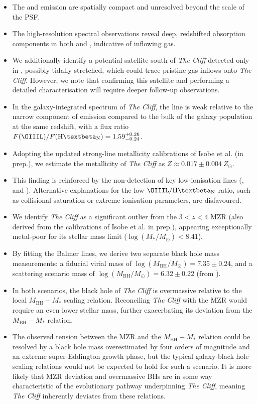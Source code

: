\documentclass[fleqn,usenatbib]{mnras}
\newcommand{\Halpha}{\text{H\textalpha}\xspace}
\newcommand{\Hbeta}{\text{H\textbeta}\xspace}
\newcommand{\OIIall}{\forbiddenEL[O][ii][\textlambda][\textlambda][3727,][3729]}
\newcommand{\SIIall}{\forbiddenEL[S][ii][\textlambda][\textlambda][6716,][6731]}
\newcommand{\NIIall}{\forbiddenEL[N][ii][\textlambda][\textlambda][6548,][6583]}
\newcommand{\cliff}{\textit{The Cliff}\xspace}
\begin{document}
\begin{itemize}
    \item The \Hbeta and \OIIIL emission are spatially compact and unresolved beyond the scale of the PSF.
    \item The high-resolution spectral observations reveal deep, redshifted absorption components in both \Halpha and \Hbeta, indicative of inflowing gas. 
    \item We additionally identify a potential satellite south of \cliff detected only in \Halpha, possibly tidally stretched, which could trace pristine gas inflows onto \cliff. However, we note that confirming this satellite and performing a detailed characterisation will require deeper follow-up observations.
    \item In the galaxy-integrated spectrum of \cliff, the \OIIIL[5007] line is weak relative to the narrow component of \Hbeta emission compared to the bulk of the galaxy population at the same redshift, with a flux ratio $F(\OIIIL)/F(\Hbeta_\mathrm{N}) = 1.59^{+0.26}_{-0.24}$.
    \item Adopting the updated strong-line metallicity calibrations of Isobe et al. (in prep.), we estimate the metallicity of \cliff as $Z \approx 0.017\pm0.004 \ Z_\odot$.
    \item This finding is reinforced by the non-detection of key low-ionisation lines (\OIIall, \NIIall and \SIIall). Alternative explanations for the low $\OIIIL/\Hbeta_\mathrm{N}$ ratio, such as collisional saturation or extreme ionisation parameters, are disfavoured. 
    \item We identify \cliff as a significant outlier from the $3<z<4$ MZR (also derived from the calibrations of Isobe et al. in prep.), appearing exceptionally metal-poor for its stellar mass limit ($\log(M_\ast/M_\odot) < 8.41$).
    \item By fitting the Balmer lines, we derive two separate black hole mass measurements: a fiducial virial mass of $\log(M_\mathrm{BH}/M_\odot) = 7.35\pm0.24$, and a scattering scenario mass of $\log(M_\mathrm{BH}/M_\odot) = 6.32\pm0.22$ (from \Halpha). 
    \item In both scenarios, the black hole of \cliff is overmassive relative to the local $M_\mathrm{BH}-M_\ast$ scaling relation. Reconciling \cliff with the MZR would require an even lower stellar mass, further exacerbating its deviation from the $M_\mathrm{BH}-M_\ast$ relation.
    \item The observed tension between the MZR and the $M_\mathrm{BH}-M_\ast$ relation could be resolved by a black hole mass overestimated by four orders of magnitude and an extreme super-Eddington growth phase, but the typical galaxy-black hole scaling relations would not be expected to hold for such a scenario. It is more likely that MZR deviation and overmassive BHs are in some way characteristic of the evolutionary pathway underpinning \cliff, meaning \cliff inherently deviates from these relations.

\end{itemize}
\end{document}
